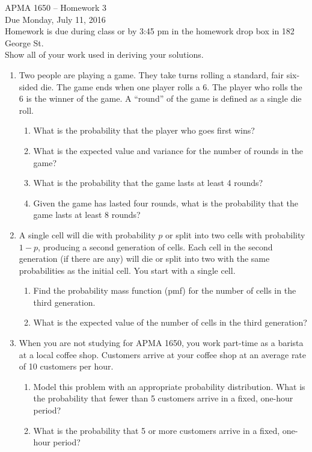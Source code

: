 \documentclass[12pt]{article}
\begin{document}
\title{}
\author{\vspace{-10ex} }

\begin{center}
{\LARGE APMA 1650 -- Homework 3}\\
\vspace{5mm}
{\large Due Monday, July 11, 2016}\\
\vspace{5mm}
Homework is due during class or by 3:45 pm in the homework drop box in 182 George St.\\
Show all of your work used in deriving your solutions.
\end{center}

\begin{enumerate}

\item Two people are playing a game. They take turns rolling a standard, fair six-sided die. The game ends when one player rolls a 6. The player who rolls the 6 is the winner of the game. A ``round'' of the game is defined as a single die roll.
\begin{enumerate}
\item What is the probability that the player who goes first wins?
\item What is the expected value and variance for the number of rounds in the game?
\item What is the probability that the game lasts at least 4 rounds?
\item Given the game has lasted four rounds, what is the probability that the game lasts at least 8 rounds?
\end{enumerate}

\item A single cell will die with probability $p$ or split into two cells with probability $1 − p$, producing a second generation of cells. Each cell in the second generation (if there are any) will die or split into two with the same probabilities as the initial cell. You start with a single cell.
\begin{enumerate}
\item Find the probability mass function (pmf) for the number of cells in the third generation.
\item What is the expected value of the number of cells in the third generation?
\end{enumerate}

\item When you are not studying for APMA 1650, you work part-time as a barista at a local coffee shop. Customers arrive at your coffee shop at an average rate of 10 customers per hour.
\begin{enumerate}
\item Model this problem with an appropriate probability distribution. What is the probability that fewer than 5 customers arrive in a fixed, one-hour period?
\item What is the probability that 5 or more customers arrive in a fixed, one-hour period?\\


\end{enumerate}
\end{enumerate}
\end{document}
